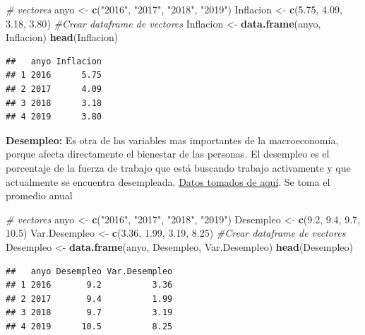 \documentclass[
  11pt,
  a4paper,
]{book}
\newenvironment{Shaded}{\begin{snugshade}}{\end{snugshade}}
\newcommand{\CommentTok}[1]{\textcolor[rgb]{0.56,0.35,0.01}{\textit{#1}}}
\newcommand{\FloatTok}[1]{\textcolor[rgb]{0.00,0.00,0.81}{#1}}
\newcommand{\KeywordTok}[1]{\textcolor[rgb]{0.13,0.29,0.53}{\textbf{#1}}}
\newcommand{\NormalTok}[1]{#1}
\newcommand{\StringTok}[1]{\textcolor[rgb]{0.31,0.60,0.02}{#1}}
\begin{document}
\begin{Shaded}
\begin{Highlighting}[]
\CommentTok{# vectores }
\NormalTok{anyo <-}\StringTok{ }\KeywordTok{c}\NormalTok{(}\StringTok{"2016"}\NormalTok{, }\StringTok{"2017"}\NormalTok{, }\StringTok{"2018"}\NormalTok{, }\StringTok{"2019"}\NormalTok{)}
\NormalTok{Inflacion <-}\StringTok{ }\KeywordTok{c}\NormalTok{(}\FloatTok{5.75}\NormalTok{, }\FloatTok{4.09}\NormalTok{, }\FloatTok{3.18}\NormalTok{, }\FloatTok{3.80}\NormalTok{)}
\CommentTok{#Crear dataframe de vectores}
\NormalTok{Inflacion <-}\StringTok{ }\KeywordTok{data.frame}\NormalTok{(anyo, Inflacion)}
\KeywordTok{head}\NormalTok{(Inflacion)}
\end{Highlighting}
\end{Shaded}

\begin{verbatim}
##   anyo Inflacion
## 1 2016      5.75
## 2 2017      4.09
## 3 2018      3.18
## 4 2019      3.80
\end{verbatim}

\textbf{Desempleo:} Es otra de las variables mas importantes de la
macroeconomía, porque afecta directamente el bienestar de las personas.
El desempleo es el porcentaje de la fuerza de trabajo que está buscando
trabajo activamente y que actualmente se encuentra desempleada.
\href{https://www.dane.gov.co/index.php/estadisticas-por-tema/mercado-laboral/empleo-y-desempleo}{Datos
tomados de aquí}. Se toma el promedio anual

\begin{Shaded}
\begin{Highlighting}[]
\CommentTok{# vectores }
\NormalTok{anyo <-}\StringTok{ }\KeywordTok{c}\NormalTok{(}\StringTok{"2016"}\NormalTok{, }\StringTok{"2017"}\NormalTok{, }\StringTok{"2018"}\NormalTok{, }\StringTok{"2019"}\NormalTok{)}
\NormalTok{Desempleo <-}\StringTok{ }\KeywordTok{c}\NormalTok{(}\FloatTok{9.2}\NormalTok{, }\FloatTok{9.4}\NormalTok{, }\FloatTok{9.7}\NormalTok{, }\FloatTok{10.5}\NormalTok{)}
\NormalTok{Var.Desempleo <-}\StringTok{ }\KeywordTok{c}\NormalTok{(}\FloatTok{3.36}\NormalTok{, }\FloatTok{1.99}\NormalTok{, }\FloatTok{3.19}\NormalTok{, }\FloatTok{8.25}\NormalTok{)}
\CommentTok{#Crear dataframe de vectores}
\NormalTok{Desempleo <-}\StringTok{ }\KeywordTok{data.frame}\NormalTok{(anyo, Desempleo, Var.Desempleo)}
\KeywordTok{head}\NormalTok{(Desempleo)}
\end{Highlighting}
\end{Shaded}

\begin{verbatim}
##   anyo Desempleo Var.Desempleo
## 1 2016       9.2          3.36
## 2 2017       9.4          1.99
## 3 2018       9.7          3.19
## 4 2019      10.5          8.25
\end{verbatim}
\end{document}
